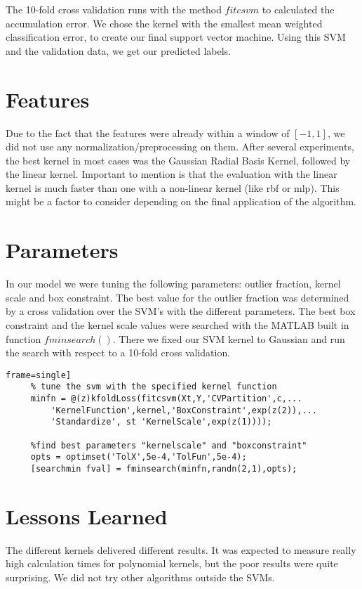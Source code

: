 \documentclass[a4paper, 11pt]{article}
\begin{document}
The 10-fold cross validation runs with the method $fitcsvm$ to calculated the accumulation error. We chose the kernel with the smallest mean weighted classification error, to create our final support vector machine.
Using this SVM and the validation data, we get our predicted labels.

\section{Features}

Due to the fact that the features were already within a window of $[-1,1]$, we did not use any normalization/preprocessing on them. After several experiments, the best kernel in most cases was the Gaussian Radial Basis Kernel, followed by the linear kernel. Important to mention is that the evaluation with the linear kernel is much faster than one with a non-linear kernel (like rbf or mlp). This might be a factor to consider depending on the final application of the algorithm.

\section{Parameters}
In our model we were tuning the following parameters: outlier fraction, kernel scale and box constraint. The best value for the outlier fraction was determined by a cross validation over the SVM's with the different parameters. The best box constraint and the kernel scale values were searched with the MATLAB built in function $fminsearch()$.
There we fixed our SVM kernel to Gaussian and run the search with respect to a 10-fold cross validation. 

\begin{lstlisting}frame=single]
	 % tune the svm with the specified kernel function
	 minfn = @(z)kfoldLoss(fitcsvm(Xt,Y,'CVPartition',c,...
		 'KernelFunction',kernel,'BoxConstraint',exp(z(2)),...
		 'Standardize', st 'KernelScale',exp(z(1))));
	 
	 %find best parameters "kernelscale" and "boxconstraint"   
	 opts = optimset('TolX',5e-4,'TolFun',5e-4);
	 [searchmin fval] = fminsearch(minfn,randn(2,1),opts);
\end{lstlisting}

\section{Lessons Learned} 

The different kernels delivered different results. It was expected to measure really high calculation times for polynomial kernels, but the poor results were quite surprising.
We did not try other algorithms outside the SVMs.
\end{document}

